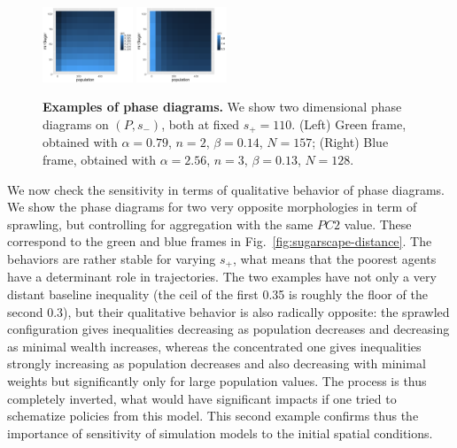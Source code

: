 \documentclass[Afour,sageh,times]{sagej}
\begin{document}
\begin{figure}
\centering
\includegraphics[width=0.24\textwidth]{figures/phasediagram_id27_maxSugar110}
\includegraphics[width=0.24\textwidth]{figures/phasediagram_id0_maxSugar110}
\caption{\textbf{Examples of phase diagrams.} We show two dimensional phase diagrams on $(P,s_-)$, both at fixed $s_+ = 110$. (Left) Green frame, obtained with $\alpha = 0.79$, $n=2$, $\beta = 0.14$, $N=157$; (Right) Blue frame, obtained with $\alpha = 2.56$, $n=3$, $\beta = 0.13$, $N=128$.}
\label{fig:sugarscape-phasediagrams}
\end{figure}

We now check the sensitivity in terms of qualitative behavior of phase diagrams. We show the phase diagrams for two very opposite morphologies in term of sprawling, but controlling for aggregation with the same $PC2$ value. These correspond to the green and blue frames in Fig.~\ref{fig:sugarscape-distance}. The behaviors are rather stable for varying $s_+$, what means that the poorest agents have a determinant role in trajectories. The two examples have not only a very distant baseline inequality (the ceil of the first 0.35 is roughly the floor of the second 0.3), but their qualitative behavior is also radically opposite: the sprawled configuration gives inequalities decreasing as population decreases and decreasing as minimal wealth increases, whereas the concentrated one gives inequalities strongly increasing as population decreases and also decreasing with minimal weights but significantly only for large population values. The process is thus completely inverted, what would have significant impacts if one tried to schematize policies from this model. This second example confirms thus the importance of sensitivity of simulation models to the initial spatial conditions.

\end{document}
